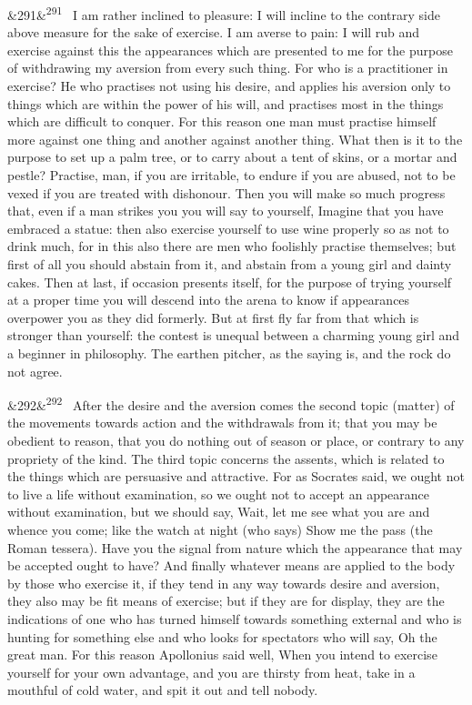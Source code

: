 \documentclass[12pt]{article}
\newcommand{\para}[1][]{\par\noindent\ifx&#1&\else\textsuperscript{\footnotesize #1}~\fi}
\begin{document}
\para[291] I am rather inclined to pleasure: I will incline to the contrary side above measure for the sake of exercise. I am averse to pain: I will rub and exercise against this the appearances which are presented to me for the purpose of withdrawing my aversion from every such thing. For who is a practitioner in exercise? He who practises not using his desire, and applies his aversion only to things which are within the power of his will, and practises most in the things which are difficult to conquer. For this reason one man must practise himself more against one thing and another against another thing. What then is it to the purpose to set up a palm tree, or to carry about a tent of skins, or a mortar and pestle? Practise, man, if you are irritable, to endure if you are abused, not to be vexed if you are treated with dishonour. Then you will make so much progress that, even if a man strikes you you will say to yourself, Imagine that you have embraced a statue: then also exercise yourself to use wine properly so as not to drink much, for in this also there are men who foolishly practise themselves; but first of all you should abstain from it, and abstain from a young girl and dainty cakes. Then at last, if occasion presents itself, for the purpose of trying yourself at a proper time you will descend into the arena to know if appearances overpower you as they did formerly. But at first fly far from that which is stronger than yourself: the contest is unequal between a charming young girl and a beginner in philosophy. The earthen pitcher, as the saying is, and the rock do not agree.

\para[292] After the desire and the aversion comes the second topic (matter) of the movements towards action and the withdrawals from it; that you may be obedient to reason, that you do nothing out of season or place, or contrary to any propriety of the kind. The third topic concerns the assents, which is related to the things which are persuasive and attractive. For as Socrates said, we ought not to live a life without examination, so we ought not to accept an appearance without examination, but we should say, Wait, let me see what you are and whence you come; like the watch at night (who says) Show me the pass (the Roman tessera). Have you the signal from nature which the appearance that may be accepted ought to have? And finally whatever means are applied to the body by those who exercise it, if they tend in any way towards desire and aversion, they also may be fit means of exercise; but if they are for display, they are the indications of one who has turned himself towards something external and who is hunting for something else and who looks for spectators who will say, Oh the great man. For this reason Apollonius said well, When you intend to exercise yourself for your own advantage, and you are thirsty from heat, take in a mouthful of cold water, and spit it out and tell nobody.
\end{document}
